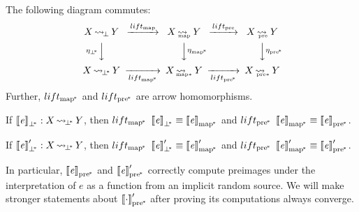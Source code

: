 \documentclass[preprint]{sigplanconf}
\newcommand{\arrow}{\rightsquigarrow}
\newcommand{\arrowlift}{\ensuremath{lift}}
\DeclareMathOperator{\botto}{\arrow_{\mspace{-3mu}\bot}}
\newcommand{\map}{_\mathrm{map}}
\DeclareMathOperator{\mapto}{\arrow_{\mspace{-21mu}\map}}
\newcommand{\liftmap}{\arrowlift\map}
\newcommand{\pre}{_\mathrm{pre}}
\DeclareMathOperator{\preto}{\arrow_{\mspace{-19mu}\pre}}
\newcommand{\liftpre}{\arrowlift\pre}
\newcommand{\pbot}{{\bot^{\mspace{-4mu}*}}}
\DeclareMathOperator{\pbotto}{\arrow_{\mspace{-3mu}\pbot}}
\newcommand{\pmap}{_\mathrm{map^{\mspace{-2mu}*}}}
\DeclareMathOperator{\pmapto}{\arrow_{\mspace{-22mu}_{\mathrm{map*}}}}
\newcommand{\liftpmap}{\arrowlift\pmap}
\newcommand{\ppre}{_\mathrm{pre^{\mspace{-2mu}*}}}
\DeclareMathOperator{\ppreto}{\arrow_{\mspace{-19mu}_{\mathrm{pre*}}}}
\newcommand{\liftppre}{\arrowlift\ppre}
\begin{document}
\begin{corollary}
The following diagram commutes:
\begin{equation}
\begin{CD}
X \botto Y   @>\liftmap>>   X \mapto Y   @>\liftpre>>   X \preto Y \\
@V{\eta_\pbot}VV             @VV{\eta\pmap}V              @VV{\eta\ppre}V\\
X \pbotto Y  @>>\liftpmap>  X \pmapto Y  @>>\liftppre>  X \ppreto Y
\end{CD}
\end{equation}
Further, $\liftpmap$ and $\liftppre$ are arrow homomorphisms.
\end{corollary}

\begin{corollary}
If $\meaningof{\mathit{e}}_\pbot : X \pbotto Y$, then $\liftpmap~\meaningof{\mathit{e}}_\pbot \equiv \meaningof{\mathit{e}}\pmap$ and $\liftppre~\meaningof{\mathit{e}}\pmap \equiv \meaningof{\mathit{e}}\ppre$.
\end{corollary}

\begin{corollary}
If $\meaningof{\mathit{e}}_\pbot' : X \pbotto Y$, then $\liftpmap~\meaningof{\mathit{e}}_\pbot' \equiv \meaningof{\mathit{e}}\pmap'$ and $\liftppre~\meaningof{\mathit{e}}\pmap' \equiv \meaningof{\mathit{e}}\ppre'$.
\end{corollary}

In particular, $\meaningof{\mathit{e}}\ppre$ and $\meaningof{\mathit{e}}\ppre'$ correctly compute preimages under the interpretation of $\mathit{e}$ as a function from an implicit random source.
We will make stronger statements about $\meaningof{\cdot}\ppre'$ after proving its computations always converge.
\end{document}
